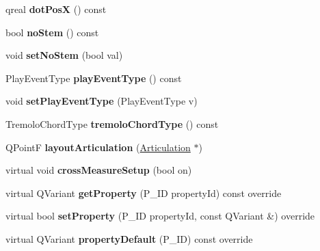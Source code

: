 \begin{DoxyCompactItemize}
qreal {\bfseries dot\+PosX} () const
\item 
\mbox{\label{class_ms_1_1_chord_a91fe4d3fdb635187c867f35d021df546}} 
bool {\bfseries no\+Stem} () const
\item 
\mbox{\label{class_ms_1_1_chord_a75e2a78efa5ef9ea261ac75009def7fc}} 
void {\bfseries set\+No\+Stem} (bool val)
\item 
\mbox{\label{class_ms_1_1_chord_a46c65274c3ef4d8158a2c234229a8a1e}} 
Play\+Event\+Type {\bfseries play\+Event\+Type} () const
\item 
\mbox{\label{class_ms_1_1_chord_a1e23e09e783b64ca97ffd48678ab349a}} 
void {\bfseries set\+Play\+Event\+Type} (Play\+Event\+Type v)
\item 
\mbox{\label{class_ms_1_1_chord_ab6d9f107efd82271221360d272035288}} 
Tremolo\+Chord\+Type {\bfseries tremolo\+Chord\+Type} () const
\item 
\mbox{\label{class_ms_1_1_chord_a025bcd611c6410ae13a879b56ef2f89b}} 
Q\+PointF {\bfseries layout\+Articulation} (\hyperlink{class_ms_1_1_articulation}{Articulation} $\ast$)
\item 
\mbox{\label{class_ms_1_1_chord_a8ebde92a439e1465c6ba4af43c7351a6}} 
virtual void {\bfseries cross\+Measure\+Setup} (bool on)
\item 
\mbox{\label{class_ms_1_1_chord_aae249628c3153e041c14c6c7dbb11bf3}} 
virtual Q\+Variant {\bfseries get\+Property} (P\+\_\+\+ID property\+Id) const override
\item 
\mbox{\label{class_ms_1_1_chord_a420d0abccd72d1d1e3d0243680a710da}} 
virtual bool {\bfseries set\+Property} (P\+\_\+\+ID property\+Id, const Q\+Variant \&) override
\item 
\mbox{\label{class_ms_1_1_chord_a37505a5afff8ac2dbee868c586b75160}} 
virtual Q\+Variant {\bfseries property\+Default} (P\+\_\+\+ID) const override
\item 
\mbox{\label{class_ms_1_1_chord_a002f7b76f9dbb928922588a224377caf}} 

\end{DoxyCompactItemize}
